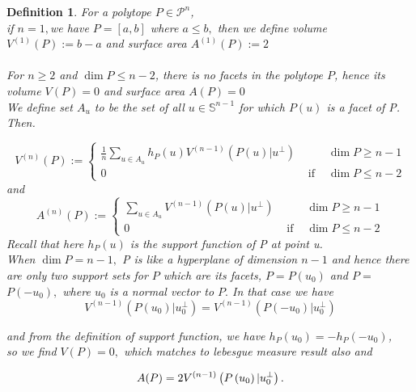 \documentclass[oneside]{book}
\newtheorem{mydef}{Definition}[section]
\begin{document}
	\begin{mydef} \label{14}
		For a polytope $P \in \mathcal{P}^{n}$,\\
		if  $n=1,$we have  $P=[a, b]$ where $a \leq b,$ then we define volume $V^{(1)}(P):=b-a$ and  surface area $A^{(1)}(P):=2$ 
		\\\\
		For  $ n \geq 2  $ and $\operatorname{dim} P \leq n-2$, there is no facets in the polytope $P$, hence its volume $V(P)=0$ and surface area $A(P)=0$ \\
		
		We define set $A_{{u}}$ to be the set of all $u \in \mathbb{S}^{n-1}$ for which $P(u)$ is a facet of P. Then. 
		
		\begin{equation}
		\label{eq43}
		V^{(n)}(P):=\left\{\begin{array}{ccc}
		\frac{1}{n}  \sum_{u \in A_{u}} h_{P}(u) V^{(n-1)}\left(P(u) | u^{\perp}\right) & & \operatorname{dim} P \geq n-1 \\
		0 & \text { if } & \operatorname{dim} P \leq n-2
		\end{array} 
		\right.
		\end{equation}
		and
		\begin{equation}
		\label{eq44}
		A^{(n)}(P):=\left\{\begin{array}{ccc}
		\sum_{u \in A_{u}} V^{(n-1)}\left(P(u) | u^{\perp}\right) & & \operatorname{dim} P \geq n-1 \\
		0 & \text { if } & \operatorname{dim} P \leq n-2
		\end{array}\right.
		\end{equation}
		Recall that here $h_{P}(u)$ is the support function of P at point u. \\
		When $\operatorname{dim} P=n-1, $ P is like a hyperplane of dimension $n - 1$  and hence there are only two support sets for $P$ which are its facets, $P=P\left(u_{0}\right)$ and $P=$ $P\left(-u_{0}\right),$ where $u_{0}$ is a normal vector to $P .$ In that case we have $$V^{(n-1)}\left(P\left(u_{0}\right) | u_{0}^{\perp}\right)=V^{(n-1)}\left(P\left(-u_{0}\right) | u_{0}^{\perp}\right)$$
		
		and from the  definition of support function, we have $h_{P}\left(u_{0}\right)=-h_{P}\left(-u_{0}\right)$,\\ so we find $V(P)=0,$ which matches to lebesgue measure result also  and 
		
		\begin{equation}
		\label{eq45}
		A(P)=2 V^{(n-1)}\left(P\left(u_{0}\right) | u_{0}^{\perp}\right).\\\\
		\end{equation}
	\end{mydef} 
\end{document}
